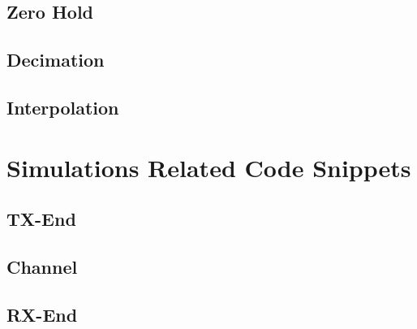 \documentclass[]{article}
\begin{document}
\subsection{Zero Hold}
\label{app:zero}
\subsection{Decimation}
\label{app:ad}

\subsection{Interpolation}
\label{app:da}



\section{Simulations Related Code Snippets}
\subsection{TX-End}
\label{app:TX_snip}

\subsection{Channel}
\label{app:chan_snip}

\subsection{RX-End}
\label{app:RX_snip}

\end{document}
